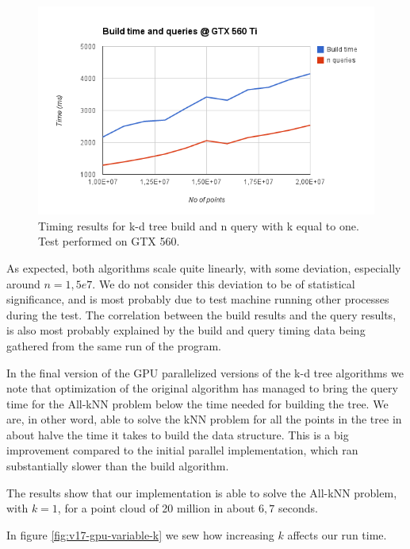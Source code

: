 \begin{figure}[ht!]
    \centering
    \includegraphics[width=120mm]{../gfx/v17-gtx-560.png}
    \caption{Timing results for k-d tree build and n query with k equal to one. Test performed on GTX 560.}
    \label{fig:v17-gtx-560}
\end{figure}

As expected, both algorithms scale quite linearly, with some deviation, especially around $n=1,5e7$. We do not consider this deviation to be of statistical significance, and is most probably due to test machine running other processes during the test. The correlation between the build results and the query results, is also most probably explained by the build and query timing data being gathered from the same run of the program.

In the final version of the GPU parallelized versions of the k-d tree algorithms we note that optimization of the original algorithm has managed to bring the query time for the All-kNN problem below the time needed for building the tree. We are, in other word, able to solve the kNN problem for all the points in the tree in about halve the time it takes to build the data structure. This is a big improvement compared to the initial parallel implementation, which ran substantially slower than the build algorithm.

The results show that our implementation is able to solve the All-kNN problem, with $k=1$, for a point cloud of 20 million in about $6,7$ seconds.

In figure \ref{fig:v17-gpu-variable-k} we sew how increasing $k$ affects our run time.

